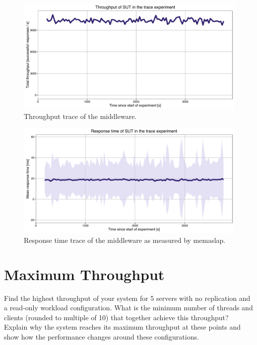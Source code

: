 \documentclass[11pt]{article}
\begin{document}
\begin{figure}[h]
\centering
\includegraphics[width=\textwidth]{../results/trace_rep3/graphs/throughput.pdf}
\caption{Throughput trace of the middleware.}
\label{fig:trace:throughput}
\end{figure}

\begin{figure}[h]
\centering
\includegraphics[width=\textwidth]{../results/trace_rep3/graphs/responsetime.pdf}
\caption{Response time trace of the middleware as measured by memaslap.}
\label{fig:trace:responsetime}
\end{figure}

\section{Maximum Throughput}

Find the highest throughput of your system for 5 servers with no replication and a read-only workload configuration. What is the minimum number of threads and clients (rounded to multiple of 10) that together achieve this throughput? Explain why the system reaches its maximum throughput at these points and show how the performance changes around these configurations.
\end{document}

